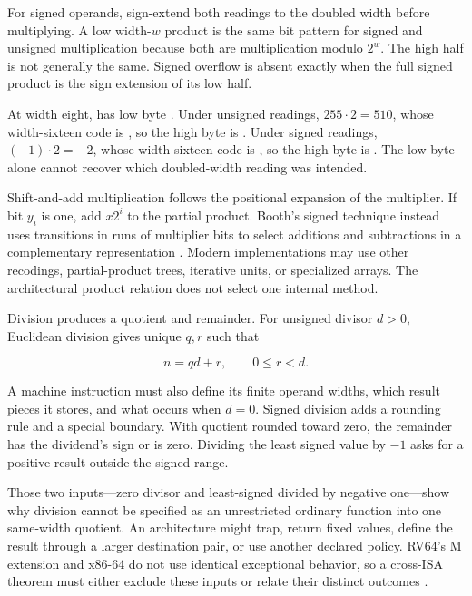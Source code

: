 For signed operands, sign-extend both readings to the doubled width before
multiplying. A low width-\(w\) product is the same bit pattern for signed and
unsigned multiplication because both are multiplication modulo \(2^w\). The
high half is not generally the same. Signed overflow is absent exactly when
the full signed product is the sign extension of its low half.

\begin{example}[title={The same low product can hide different high facts}]
At width eight,  has low byte . Under unsigned readings,
\(255\cdot2=510\), whose width-sixteen code is , so the high byte
is . Under signed readings, \((-1)\cdot2=-2\), whose width-sixteen
code is , so the high byte is . The low byte alone cannot
recover which doubled-width reading was
intended.
\end{example}

Shift-and-add multiplication follows the positional expansion of the
multiplier. If bit \(y_i\) is one, add \(x2^i\) to the partial product. Booth's
signed technique instead uses transitions in runs of multiplier bits to select
additions and subtractions in a complementary representation
\autocite{booth1951multiplication}. Modern implementations may use other
recodings, partial-product trees, iterative units, or specialized arrays. The
architectural product relation does not select one internal method.

Division produces a quotient and remainder. For unsigned divisor \(d>0\),
Euclidean division gives unique \(q,r\) such that

\[
  n=qd+r,
  \qquad 0\leq r<d.
\]

A machine instruction must also define its finite operand widths, which result
pieces it stores, and what occurs when \(d=0\). Signed division adds a rounding
rule and a special boundary. With quotient rounded toward zero, the remainder
has the dividend's sign or is zero. Dividing the least signed value by
\(-1\) asks for a positive result outside the signed range.

Those two inputs—zero divisor and least-signed divided by negative one—show why
division cannot be specified as an unrestricted ordinary function into one
same-width quotient. An architecture might trap, return fixed values, define
the result through a larger destination pair, or use another declared policy.
RV64's M extension and x86-64 do not use identical exceptional behavior, so a
cross-ISA theorem must either exclude these inputs or relate their distinct
outcomes \autocite{riscv2026unpriv,intel2026sdm2}.

